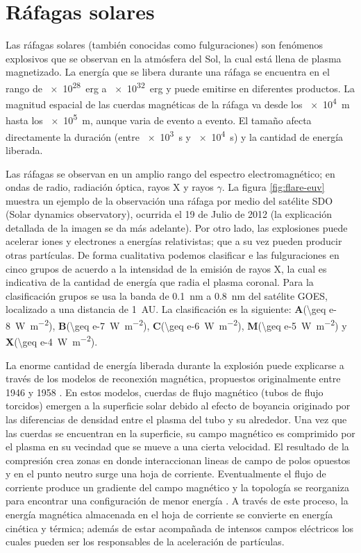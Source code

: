 \section{Ráfagas solares}

Las ráfagas solares (también conocidas como fulguraciones) son fenómenos explosivos que se observan en la atmósfera del Sol, la cual está llena de plasma magnetizado. La energía que se libera durante una ráfaga se encuentra en el rango de \SI{e28}{erg} a \SI{e32}{erg} y puede emitirse en diferentes productos. La magnitud espacial de las cuerdas magnéticas de la ráfaga va desde los \SI{e4}{\metre} hasta los \SI{e5}{\metre}, aunque varia de evento a evento. El tamaño afecta directamente la duración (entre \SI{e3}{\second} y \SI{e4}{\second}) y la cantidad de energía liberada.

Las ráfagas se observan en un amplio rango del espectro electromagnético; en ondas de radio, radiación óptica, rayos X y rayos $\gamma$. La figura \ref{fig:flare-euv} muestra un ejemplo de la observación una ráfaga por medio del satélite SDO (Solar dynamics observatory), ocurrida el \num{19} de Julio de \num{2012} (la explicación detallada de la imagen se da más adelante). Por otro lado, las explosiones puede acelerar iones y electrones a energías relativistas; que a su vez pueden producir otras partículas. De forma cualitativa podemos clasificar e las fulguraciones en cinco grupos de acuerdo a la intensidad de la emisión de rayos X, la cual es indicativa de la cantidad de energía que radia el plasma coronal. Para la clasificación grupos se usa la banda de \SI{0.1}{\nano\metre} a \SI{0.8}{\nano\metre} del satélite GOES, localizado a una distancia de \SI{1}{AU}. La clasificación es la siguiente: \textbf{A}(\SI{\geq e-8}{\watt\per\square\metre}), \textbf{B}(\SI{\geq e-7}{\watt\per\square\metre}), \textbf{C}(\SI{\geq e-6}{\watt\per\square\metre}), \textbf{M}(\SI{\geq e-5}{\watt\per\square\metre}) y \textbf{X}(\SI{\geq e-4}{\watt\per\square\metre}).

La enorme cantidad de energía liberada durante la explosión puede explicarse a través de los modelos de reconexión magnética, propuestos originalmente entre \num{1946} y \num{1958} \cite{giovanelli,hoyle,sweet,parker}. En estos modelos, cuerdas de flujo magnético (tubos de flujo torcidos) emergen a la superficie solar debido al efecto de boyancia originado por las diferencias de densidad entre el plasma del tubo y su alrededor. Una vez que las cuerdas se encuentran en la superficie, su campo magnético es comprimido por el plasma en su vecindad que se mueve a una cierta velocidad. El resultado de la compresión crea zonas en donde interaccionan lineas de campo de polos opuestos y en el punto neutro surge una hoja de corriente. Eventualmente el flujo de corriente produce un gradiente del campo magnético y la topología se reorganiza para encontrar una configuración de menor energía \cite{shiba11}. A través de este proceso, la energía magnética almacenada en el hoja de corriente se convierte en energía cinética y térmica; además de estar acompañada de intensos campos eléctricos los cuales pueden ser los responsables de la aceleración de partículas.

